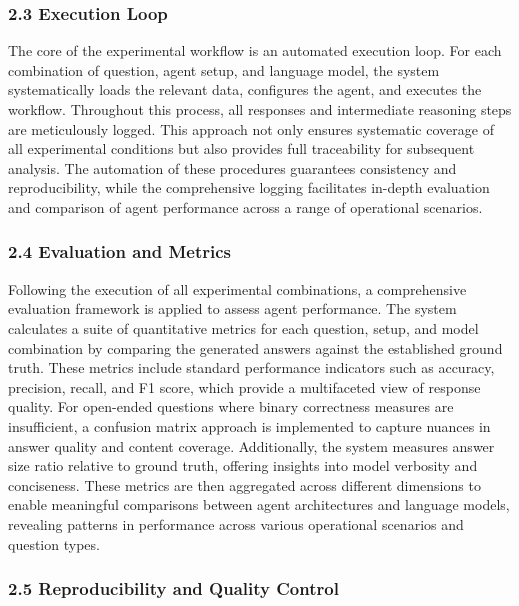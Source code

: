             \subsubsection{2.3 Execution Loop}

            The core of the experimental workflow is an automated execution loop. For each combination of question, agent setup, and language model, the system systematically loads the relevant data, configures the agent, and executes the workflow. Throughout this process, all responses and intermediate reasoning steps are meticulously logged. This approach not only ensures systematic coverage of all experimental conditions but also provides full traceability for subsequent analysis. The automation of these procedures guarantees consistency and reproducibility, while the comprehensive logging facilitates in-depth evaluation and comparison of agent performance across a range of operational scenarios.

            \subsubsection{2.4 Evaluation and Metrics}

            Following the execution of all experimental combinations, a comprehensive evaluation framework is applied to assess agent performance. The system calculates a suite of quantitative metrics for each question, setup, and model combination by comparing the generated answers against the established ground truth. These metrics include standard performance indicators such as accuracy, precision, recall, and F1 score, which provide a multifaceted view of response quality. For open-ended questions where binary correctness measures are insufficient, a confusion matrix approach is implemented to capture nuances in answer quality and content coverage. Additionally, the system measures answer size ratio relative to ground truth, offering insights into model verbosity and conciseness. These metrics are then aggregated across different dimensions to enable meaningful comparisons between agent architectures and language models, revealing patterns in performance across various operational scenarios and question types.

            \subsubsection{2.5 Reproducibility and Quality Control}

